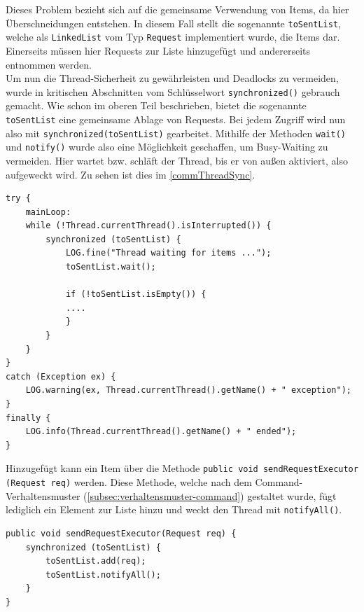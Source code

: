 Dieses Problem bezieht sich auf die gemeinsame Verwendung von Items, da hier Überschneidungen entstehen.
In diesem Fall stellt die sogenannte \lstinline[style=java]{toSentList}, welche als \lstinline[style=java]{LinkedList} vom Typ \lstinline[style=java]{Request} implementiert wurde, die Items dar.
Einerseits müssen hier Requests zur Liste hinzugefügt und andererseits entnommen werden.\\
Um nun die Thread-Sicherheit zu gewährleisten und Deadlocks zu vermeiden, wurde in kritischen Abschnitten vom Schlüsselwort \lstinline[style=java]{synchronized()} gebrauch gemacht.
Wie schon im oberen Teil beschrieben, bietet die sogenannte \lstinline[style=java]{toSentList} eine gemeinsame Ablage von Requests.
Bei jedem Zugriff wird nun also mit \lstinline[style=java]{synchronized(toSentList)} gearbeitet.
Mithilfe der Methoden \lstinline[style=java]{wait()} und \lstinline[style=java]{notify()} wurde also eine Möglichkeit geschaffen, um Busy-Waiting zu vermeiden.
Hier wartet bzw. schläft der Thread, bis er von außen aktiviert, also aufgeweckt wird.
Zu sehen ist dies im \autoref{commThreadSync}.
\begin{lstlisting}[style=java,caption=Teilabschnitt CommunicationSendThread,label=commThreadSync]
try {
    mainLoop:
    while (!Thread.currentThread().isInterrupted()) {
        synchronized (toSentList) {
            LOG.fine("Thread waiting for items ...");
            toSentList.wait();

            if (!toSentList.isEmpty()) {
            ....
            }
        }
    }
}
catch (Exception ex) {
    LOG.warning(ex, Thread.currentThread().getName() + " exception");
}
finally {
    LOG.info(Thread.currentThread().getName() + " ended");
}
\end{lstlisting}
Hinzugefügt kann ein Item über die Methode \lstinline[style=java]{public void sendRequestExecutor (Request req)} werden.
Diese Methode, welche nach dem Command-Verhaltensmuster (\autoref{subsec:verhaltensmuster-command}) gestaltet wurde, fügt lediglich ein Element zur Liste hinzu und weckt den Thread mit \lstinline[style=java]{notifyAll()}.
%
\begin{lstlisting}[style=java,caption=Methode sendRequestExecutor(),label=sendRequestExecutor()]
public void sendRequestExecutor(Request req) {
    synchronized (toSentList) {
        toSentList.add(req);
        toSentList.notifyAll();
    }
}
\end{lstlisting}
